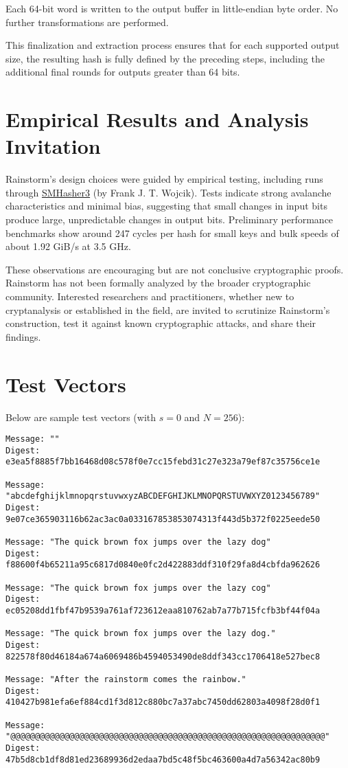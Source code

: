 \documentclass[11pt,a4paper]{article}
\begin{document}
Each 64-bit word is written to the output buffer in little-endian byte order. No further transformations are performed.

\medskip

This finalization and extraction process ensures that for each supported output size, the resulting hash is fully defined by the preceding steps, including the additional final rounds for outputs greater than 64 bits.

\section*{Empirical Results and Analysis Invitation}
Rainstorm’s design choices were guided by empirical testing, including runs through \href{https://gitlab.com/fwojcik/smhasher3}{SMHasher3} (by Frank J. T. Wojcik). Tests indicate strong avalanche characteristics and minimal bias, suggesting that small changes in input bits produce large, unpredictable changes in output bits. Preliminary performance benchmarks show around 247 cycles per hash for small keys and bulk speeds of about 1.92 GiB/s at 3.5 GHz.

These observations are encouraging but are not conclusive cryptographic proofs. Rainstorm has not been formally analyzed by the broader cryptographic community. Interested researchers and practitioners, whether new to cryptanalysis or established in the field, are invited to scrutinize Rainstorm’s construction, test it against known cryptographic attacks, and share their findings.

\section*{Test Vectors}
Below are sample test vectors (with $s=0$ and $N=256$):

\begin{verbatim}
Message: ""
Digest: e3ea5f8885f7bb16468d08c578f0e7cc15febd31c27e323a79ef87c35756ce1e

Message: "abcdefghijklmnopqrstuvwxyzABCDEFGHIJKLMNOPQRSTUVWXYZ0123456789"
Digest: 9e07ce365903116b62ac3ac0a033167853853074313f443d5b372f0225eede50

Message: "The quick brown fox jumps over the lazy dog"
Digest: f88600f4b65211a95c6817d0840e0fc2d422883ddf310f29fa8d4cbfda962626

Message: "The quick brown fox jumps over the lazy cog"
Digest: ec05208dd1fbf47b9539a761af723612eaa810762ab7a77b715fcfb3bf44f04a

Message: "The quick brown fox jumps over the lazy dog."
Digest: 822578f80d46184a674a6069486b4594053490de8ddf343cc1706418e527bec8

Message: "After the rainstorm comes the rainbow."
Digest: 410427b981efa6ef884cd1f3d812c880bc7a37abc7450dd62803a4098f28d0f1

Message: "@@@@@@@@@@@@@@@@@@@@@@@@@@@@@@@@@@@@@@@@@@@@@@@@@@@@@@@@@@@@@@@@"
Digest: 47b5d8cb1df8d81ed23689936d2edaa7bd5c48f5bc463600a4d7a56342ac80b9
\end{verbatim}
\end{document}
